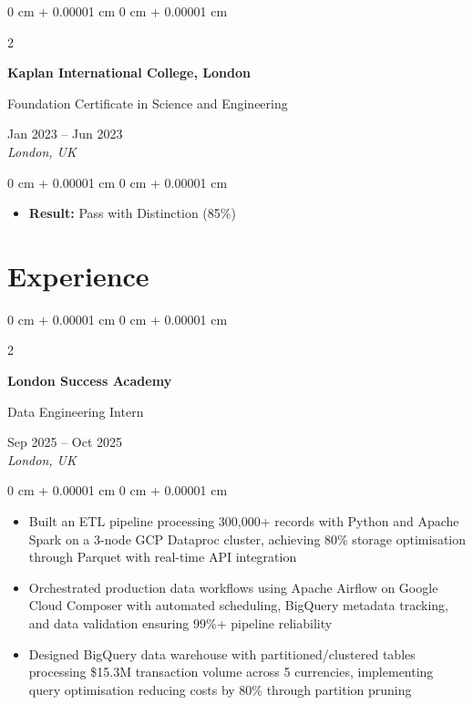 \documentclass[10pt, a4paper]{article}
\newenvironment{highlights}{
    \begin{itemize}[
        topsep=0.10 cm,
        parsep=0.10 cm,
        partopsep=0pt,
        itemsep=0pt,
        leftmargin=20pt
    ]
}{
    \end{itemize}
} %
\newenvironment{onecolentry}{
    \begin{adjustwidth}{
        0 cm + 0.00001 cm
    }{
        0 cm + 0.00001 cm
    }
}{
    \end{adjustwidth}
} %
\newenvironment{twocolentry}[2][]{
    \onecolentry
    \def\secondColumn{#2}
    \setcolumnwidth{\fill, 4.5 cm}
    \begin{paracol}{2}
}{
    \switchcolumn \raggedleft \secondColumn
    \end{paracol}
    \endonecolentry
} %
\begin{document}
    \vspace{0.2 cm}

    \begin{twocolentry}{
        Jan 2023 -- Jun 2023 \\
        \textit{London, UK}
    }
        \textbf{Kaplan International College, London}

        Foundation Certificate in Science and Engineering 
    \end{twocolentry}

    \vspace{0.10 cm}
    \begin{onecolentry}
        \begin{highlights}
            \item \textbf{Result:} Pass with Distinction (85\%)
        \end{highlights}
    \end{onecolentry}


    \section{Experience}

    \begin{twocolentry}{
        Sep 2025 -- Oct 2025 \\
        \textit{London, UK}
    }
        \textbf{London Success Academy}
        
        Data Engineering Intern
    \end{twocolentry}

    \vspace{0.10 cm}
    \begin{onecolentry}
        \begin{highlights}
            \item Built an ETL pipeline processing 300,000+ records with Python and Apache Spark on a 3-node GCP Dataproc cluster, achieving 80\% storage optimisation through Parquet with real-time API integration
            \item Orchestrated production data workflows using Apache Airflow on Google Cloud Composer with automated scheduling, BigQuery metadata tracking, and data validation ensuring 99\%+ pipeline reliability
            \item Designed BigQuery data warehouse with partitioned/clustered tables processing \$15.3M transaction volume across 5 currencies, implementing query optimisation reducing costs by 80\% through partition pruning
        \end{highlights}
    \end{onecolentry}
\end{document}
